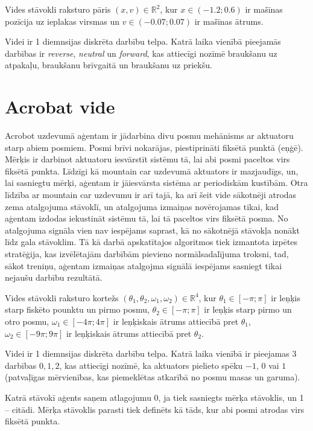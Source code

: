 \documentclass{ludis} %
\begin{document}
Vides stāvokli raksturo pāris $(x, v) \in \mathbb{R}^2$, kur $x \in (-1.2; 0.6)$
ir mašīnas pozīcija uz ieplakas virsmas un $v \in (-0.07; 0.07)$ ir mašīnas
ātrums.

Videi ir 1 diemnsijas diskrēta darbību telpa. Katrā laika vienībā pieejamās
darbības ir \textit{reverse}, \textit{neutral} un \textit{forward}, kas
attiecīgi nozīmē braukšanu uz atpakaļu, braukšanu brīvgaitā un braukšanu uz
priekšu.

\section{Acrobat vide}
Acrobot uzdevumā aģentam ir jādarbina divu posmu mehānisms ar aktuatoru starp
abiem posmiem. Posmi brīvi nokarājas, piestiprināti fiksētā punktā (eņģē).
Mērķis ir darbinot aktuatoru iesvārstīt sistēmu tā, lai abi posmi paceltos virs
fiksētā punkta. Līdzīgi kā mountain car uzdevumā aktuators ir mazjaudīgs, un,
lai sasniegtu mērķi, aģentam ir jāiesvārsta sistēma ar periodiskām kustībām.
Otra līdzība ar mountain car uzdevumu ir arī tajā, ka arī šeit vide sākotnēji
atrodas zema atalgojuma stāvoklī, un atalgojuma izmaiņas novērojamas tikai, kad
aģentam izdodas iekustināt sistēmu tā, lai tā paceltos virs fiksētā posma.
No atalgojuma signāla vien nav iespējams saprast, kā no sākotnējā stāvokļa
nonākt līdz gala stāvoklim. Tā kā darbā apskatītajos algoritmos tiek izmantota
izpētes stratēģija, kas izvēlētajām darbībām pievieno normālsadalījuma troksni,
tad, sākot treniņu, aģentam izmaiņas atalgojma signālā iespējams sasniegt tikai
nejaušu darbību rezultātā.

Vides stāvokli raksturo kortežs $(\theta_1, \theta_2, \omega_1, \omega_2) \in
\mathbb{R}^4$, kur $\theta_1 \in [-\pi; \pi]$ ir leņķis starp fiskēto pounktu un
pirmo posmu, $\theta_2 \in [-\pi; \pi]$ ir leņķis starp pirmo un otro posmu,
$\omega_1 \in [-4\pi; 4\pi]$ ir leņķiskais ātrums attiecībā pret $\theta_1$,
$\omega_2 \in [-9\pi; 9\pi]$ ir leņķiskais ātrums attiecībā pret $\theta_2$.

Videi ir 1 diemnsijas diskrēta darbību telpa. Katrā laika vienībā ir pieejamas 3
darbības ${0, 1, 2}$, kas attiecīgi nozīmē, ka aktuators pielieto spēku $-1$,
$0$ vai $1$ (patvaļīgas mērvienības, kas piemeklētas atkarībā no posmu masas un
garuma).

Katrā stāvokī aģents saņem atlagojumu 0, ja tiek sasniegts mērķa stāvoklis, un 1
-- citādi. Mērķa stāvoklis parasti tiek definēts kā tāds, kur abi posmi atrodas
virs fiksētā punkta. %
\end{document}
